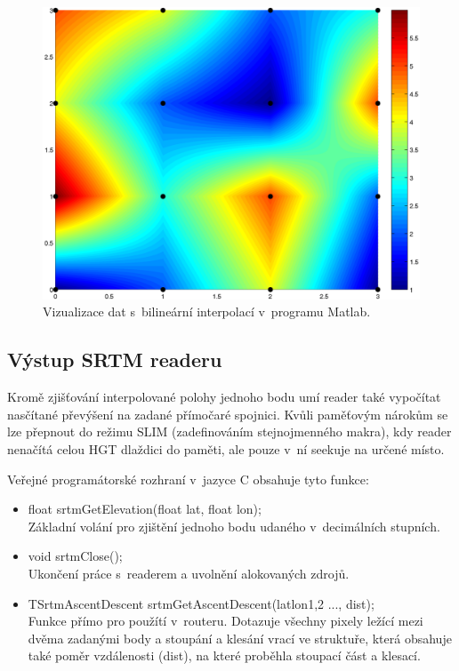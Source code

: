 \documentclass[thesis=B,czech]{FITthesis}[2012/06/26]
\begin{document}
\begin{figure}[]
\centering
\includegraphics[width=\textwidth]{obrazky/bilinearni-interpolace.png}
\caption{Vizualizace dat s~bilineární interpolací v~programu Matlab. }
\label{img:interpolace}
\end{figure}



\subsection{Výstup SRTM readeru}
Kromě zjišťování interpolované polohy jednoho bodu umí reader také vypočítat nasčítané převýšení na zadané přímočaré spojnici. Kvůli paměťovým nárokům se lze přepnout do režimu SLIM (zadefinováním stejnojmenného makra), kdy reader nenačítá celou HGT dlaždici do paměti, ale pouze v~ní seekuje na určené místo.

Veřejné programátorské rozhraní v~jazyce C obsahuje tyto funkce:
\begin{itemize}

\item{float srtmGetElevation(float lat, float lon); \\
Základní volání pro zjištění jednoho bodu udaného v~decimálních stupních.}

\item{void srtmClose(); \\
Ukončení práce s~readerem a uvolnění alokovaných zdrojů.}

\item{TSrtmAscentDescent srtmGetAscentDescent(latlon1,2 ..., dist); \\ 
 Funkce přímo pro použítí v~routeru. Dotazuje všechny pixely ležící mezi dvěma zadanými body a stoupání a klesání vrací ve struktuře, která obsahuje také poměr vzdálenosti (dist), na které proběhla stoupací část a klesací.
 }

\end{itemize}
\end{document}
